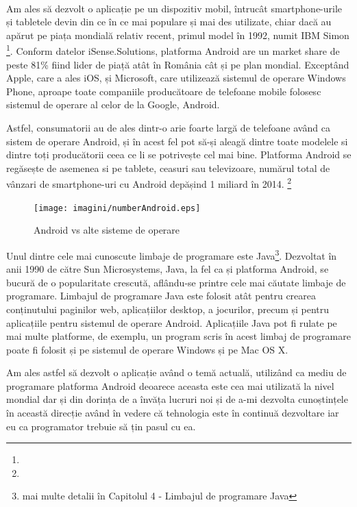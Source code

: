 \paragraph{ }
Am ales să dezvolt o aplicație pe un dispozitiv mobil, întrucât smartphone-urile și tabletele devin din ce  în ce mai populare și mai des utilizate, chiar dacă au apărut pe piața  mondială relativ recent, primul model în 1992, numit IBM Simon  \footnote{}.\newline 
Conform datelor iSense.Solutions, platforma Android are un market share de peste 81\% fiind lider de piață atât în România cât și pe plan mondial.\newline
Exceptând Apple, care a ales iOS, și Microsoft, care utilizează sistemul de operare Windows Phone, aproape toate companiile producătoare de telefoane mobile folosesc sistemul de operare al celor de la Google, Android.\newline

Astfel, consumatorii au de ales dintr-o  arie foarte largă de telefoane având ca sistem de operare Android, și în acest fel pot să-și aleagă dintre toate modelele si dintre toți producătorii ceea ce li se potrivește cel mai bine. Platforma Android se regăsește de asemenea si pe tablete, ceasuri sau televizoare, numărul total de vânzari de smartphone-uri cu Android depășind 1 miliard în 2014. \footnote{}\newpage
\begin{center}
\begin{figure}[htbp]
\caption{Android vs alte sisteme de operare}
\texttt{[image: imagini/numberAndroid.eps]}
\end{figure} 
\end{center}

Unul dintre cele mai cunoscute limbaje de programare este Java\footnote{mai multe detalii în Capitolul 4 - Limbajul de programare Java}. Dezvoltat în anii 1990 de către Sun Microsystems, Java, la fel ca și platforma Android,  se bucură de o popularitate crescută,  aflându-se printre cele mai căutate limbaje de programare. Limbajul de programare Java este folosit atât pentru crearea conținutului paginilor web, aplicațiilor desktop, a jocurilor, precum și pentru aplicațiile pentru sistemul de operare Android.
Aplicațiile Java pot fi rulate pe mai multe platforme, de exemplu, un program scris în acest limbaj de programare poate fi folosit și pe sistemul de operare Windows și pe Mac OS X.\newline 

Am ales astfel să dezvolt o aplicație având o temă actuală, utilizând ca mediu de programare platforma Android deoarece aceasta este cea mai utilizată la nivel mondial dar și din dorința de a învăța lucruri noi și de a-mi dezvolta cunoștințele în această direcție având în vedere că tehnologia este în continuă dezvoltare iar eu ca programator trebuie să țin pasul cu ea.\newline

